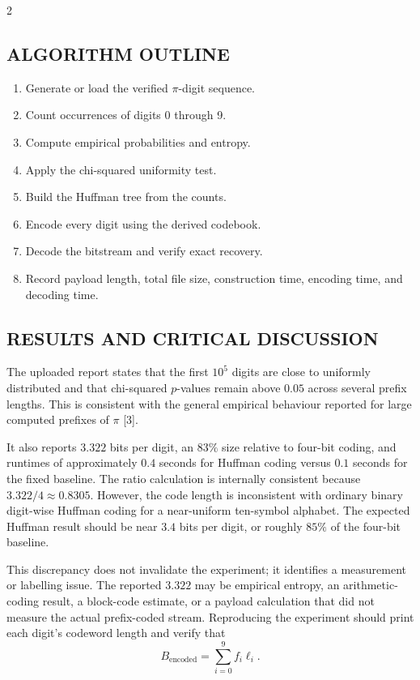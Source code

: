 \begin{multicols}{2}
  \subsection*{\centering\uppercase{Algorithm Outline}}
  \begin{enumerate}\justifying
    \item Generate or load the verified $\pi$-digit sequence.
    \item Count occurrences of digits 0 through 9.
    \item Compute empirical probabilities and entropy.
    \item Apply the chi-squared uniformity test.
    \item Build the Huffman tree from the counts.
    \item Encode every digit using the derived codebook.
    \item Decode the bitstream and verify exact recovery.
    \item Record payload length, total file size, construction time, encoding time, and decoding time.
  \end{enumerate}

  \subsection*{\centering\uppercase{Results and Critical Discussion}}
  The uploaded report states that the first $10^5$ digits are close to uniformly distributed and that chi-squared $p$-values remain above $0.05$ across several prefix lengths. This is consistent with the general empirical behaviour reported for large computed prefixes of $\pi$ [3].

  \noindent
  It also reports $3.322$ bits per digit, an $83\%$ size relative to four-bit coding, and runtimes of approximately $0.4$ seconds for Huffman coding versus $0.1$ seconds for the fixed baseline. The ratio calculation is internally consistent because $3.322/4\approx0.8305$. However, the code length is inconsistent with ordinary binary digit-wise Huffman coding for a near-uniform ten-symbol alphabet. The expected Huffman result should be near $3.4$ bits per digit, or roughly $85\%$ of the four-bit baseline.

  \noindent
  This discrepancy does not invalidate the experiment; it identifies a measurement or labelling issue. The reported $3.322$ may be empirical entropy, an arithmetic-coding result, a block-code estimate, or a payload calculation that did not measure the actual prefix-coded stream. Reproducing the experiment should print each digit's codeword length and verify that
  \[
    B_{\mathrm{encoded}}=\sum_{i=0}^{9}f_i\ell_i.
  \]


\end{multicols}
